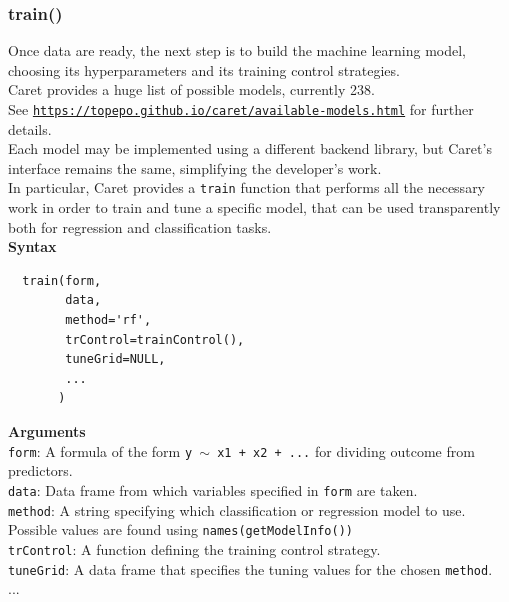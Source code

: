 \documentclass{article}
\begin{document}
\subsubsection{train()}
Once data are ready, the next step is to build the machine learning model, choosing its hyperparameters and its training control strategies.\\

Caret provides a huge list of possible models, currently 238.\\
See \href{https://topepo.github.io/caret/available-models.html}{\texttt{https://topepo.github.io/caret/available-models.html}} for further details.\\

Each model may be implemented using a different backend library, but Caret's interface remains the same, simplifying the developer's work.\\

In particular, Caret provides a \texttt{train} function that performs all the necessary work in order to train and tune a specific model, that can be used transparently both for regression and classification tasks.\\ 

\textbf{Syntax}
\begin{verbatim}
  train(form,
        data,
        method='rf',
        trControl=trainControl(),
        tuneGrid=NULL,
        ...
       )
\end{verbatim}

\pagebreak

\textbf{Arguments}\\

\texttt{form}: A formula of the form \texttt{y $\sim$  x1 + x2 + ...} for dividing outcome from \phantom{..........}
predictors.\\
\texttt{data}: Data frame from which variables specified in \texttt{form} are taken.\\
\texttt{method}: A string specifying which classification or regression model to use.\\
\phantom{..............}Possible values are found using \texttt{names(getModelInfo())}\\
\texttt{trControl}: A function defining the training control strategy.\\
\texttt{tuneGrid}: A data frame that specifies the tuning values for the chosen \texttt{method}.\\
...\\
\end{document}
